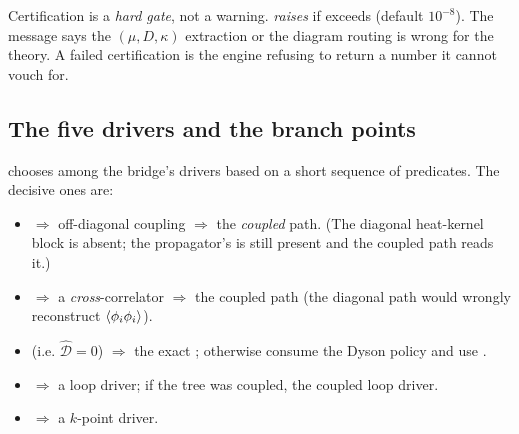 \begin{gotcha}
Certification is a \emph{hard gate}, not a warning.
 \emph{raises}
 if  exceeds
 (default $10^{-8}$). The message says the $(\mu,D,\kappa)$
extraction or the diagram routing is wrong for the theory. A failed
certification is the engine refusing to return a number it cannot vouch for.
\end{gotcha}

\subsection{The five drivers and the branch points}

 chooses among the bridge's drivers based on a short
sequence of predicates. The decisive ones are:

\begin{itemize}
  \item {} $\Rightarrow$ off-diagonal coupling
        $\Rightarrow$ the \emph{coupled} path. (The diagonal heat-kernel block is
        absent; the propagator's  is still present and the coupled
        path reads it.)
  \item {} $\Rightarrow$ a
        \emph{cross}-correlator $\Rightarrow$ the coupled path (the diagonal path
        would wrongly reconstruct $\left\langle \phi_{i}\phi_{i} \right\rangle$).
  \item {} (i.e. $\widehat{\mathcal{D}}=0$)
        $\Rightarrow$ the exact ; otherwise consume the
        Dyson policy and use .
  \item {} $\Rightarrow$ a loop driver; if the tree was coupled,
        the coupled loop driver.
  \item {} $\Rightarrow$ a $k$-point driver.
\end{itemize}


